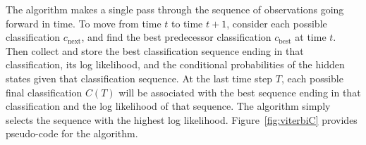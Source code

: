 \documentclass[]{article}
\newcommand{\ti}[2]{{#1}{(#2)}}                  %
\begin{document}
The algorithm makes a single pass through the sequence of observations
going forward in time.  To move from time $t$ to time $t+1$, consider
each possible classification $c_\text{next}$, and find the best
predecessor classification $c_\text{best}$ at time $t$.  Then collect
and store the best classification sequence ending in that
classification, its log likelihood, and the conditional probabilities
of the hidden states given that classification sequence.  At the last
time step $T$, each possible final classification $\ti{C}{T}$ will be
associated with the best sequence ending in that classification and
the log likelihood of that sequence.  The algorithm simply selects the
sequence with the highest log likelihood.  Figure~\ref{fig:viterbiC}
provides pseudo-code for the algorithm.
%
\end{document}
